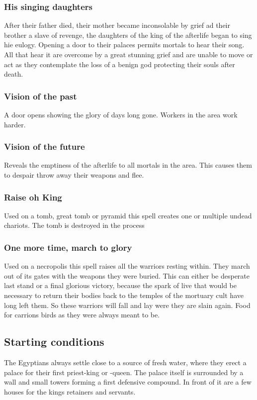 \documentclass[a4paper]{book}
\begin{document}
		\subsubsection{His singing daughters}
			After their father died, their mother became inconsolable by grief
			ad their brother a slave of revenge,
			the daughters of the king of the afterlife began to sing hie eulogy.
			Opening a door to their palaces permits mortals to hear their song.
			All that hear it are overcome by a great stunning grief
			and are unable to move or act as they contemplate the loss
			of a benign god protecting their souls after death.

		\subsubsection{Vision of the past}
			A door opens showing the glory of days long gone.
			Workers in the area work harder.

		\subsubsection{Vision of the future}
			Reveals the emptiness of the afterlife to all mortals in the area.
			This causes them to despair throw away their weapons and flee.

		\subsubsection{Raise oh King}
			Used on a tomb, great tomb or pyramid this spell creates one or multiple undead chariots.
			The tomb is destroyed in the process

		\subsubsection{One more time, march to glory}
			Used on a necropolis this spell raises all the warriors resting within.
			They march out of its gates with the weapons they were buried.
			This can either be desperate last stand or a final glorious victory,
			because the spark of live that would be necessary
			to return their bodies back to the temples of the mortuary cult
			have long left them.
			So these warriors will fall and lay were they are slain again.
			Food for carrions birds as they were always meant to be.

	\subsection{Starting conditions}
		The \gls{Egyptians} always settle close to a source of fresh water,
		where they erect a palace for their first priest-king or -queen.
		The palace itself is surrounded by a wall and small towers forming a first defensive compound.
		In front of it are a few houses for the kings retainers and servants.
\end{document}
